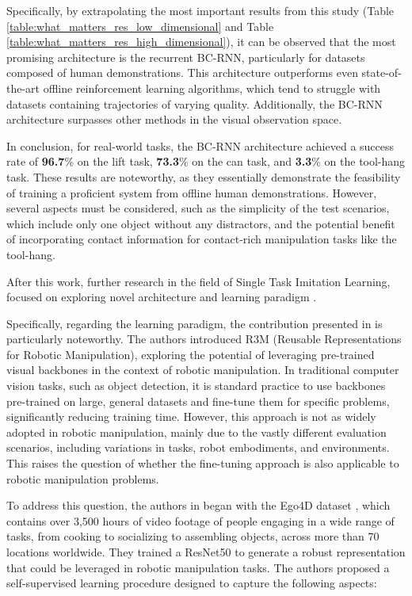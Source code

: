 Specifically, by extrapolating the most important results from this study (Table \ref{table:what_matters_res_low_dimensional} and Table \ref{table:what_matters_res_high_dimensional}), it can be observed that the most promising architecture is the recurrent BC-RNN, particularly for datasets composed of human demonstrations. This architecture outperforms even state-of-the-art offline reinforcement learning algorithms, which tend to struggle with datasets containing trajectories of varying quality. Additionally, the BC-RNN architecture surpasses other methods in the visual observation space.

In conclusion, for real-world tasks, the BC-RNN architecture achieved a success rate of \textbf{96.7}\% on the lift task, \textbf{73.3}\% on the can task, and \textbf{3.3}\% on the tool-hang task. These results are noteworthy, as they essentially demonstrate the feasibility of training a proficient system from offline human demonstrations. However, several aspects must be considered, such as the simplicity of the test scenarios, which include only one object without any distractors, and the potential benefit of incorporating contact information for contact-rich manipulation tasks like the tool-hang.


After this work, further research in the field of Single Task Imitation Learning, focused on exploring novel architecture \cite{shafiullah2022behavior} and learning paradigm \cite{nair2022r3m,cheng2023diffusion,shi2023waypoint}. 

Specifically, regarding the learning paradigm, the contribution presented in \cite{nair2022r3m} is particularly noteworthy. The authors introduced R3M (Reusable Representations for Robotic Manipulation), exploring the potential of leveraging pre-trained visual backbones in the context of robotic manipulation. In traditional computer vision tasks, such as object detection, it is standard practice to use backbones pre-trained on large, general datasets and fine-tune them for specific problems, significantly reducing training time. However, this approach is not as widely adopted in robotic manipulation, mainly due to the vastly different evaluation scenarios, including variations in tasks, robot embodiments, and environments. This raises the question of whether the fine-tuning approach is also applicable to robotic manipulation problems.

To address this question, the authors in \cite{nair2022r3m} began with the Ego4D dataset \cite{grauman2022ego4d}, which contains over 3,500 hours of video footage of people engaging in a wide range of tasks, from cooking to socializing to assembling objects, across more than 70 locations worldwide. They trained a ResNet50 \cite{resnet} to generate a robust representation that could be leveraged in robotic manipulation tasks. The authors proposed a self-supervised learning procedure designed to capture the following aspects:

